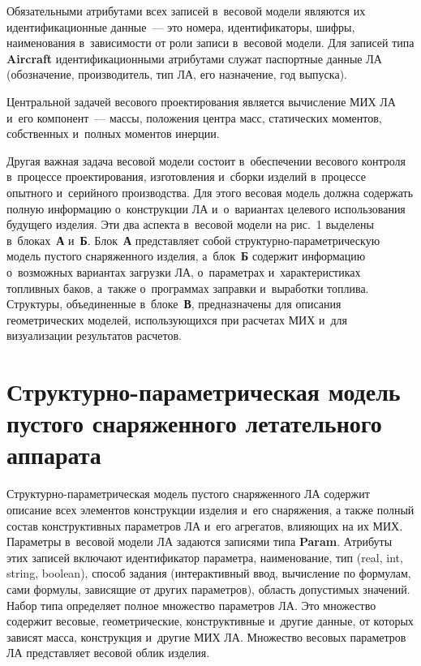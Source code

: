 \begin{multicols}{2}
Обязательными атрибутами всех записей 
в~весовой модели являются их идентификационные данные~--- это номера, 
идентификаторы, шиф\-ры, наименования в~зависимости от роли записи 
в~весовой модели. Для записей типа \textbf{Aircraft} 
идентификационными атрибутами служат паспортные данные ЛА 
(обозначение, производитель, тип ЛА, его назначение, год выпуска). 
  
  Центральной задачей весового проектирования является вычисление  
МИХ ЛА и~его компонент~--- 
массы, положения центра масс, статических моментов, собственных и~полных 
моментов инерции. 

Другая важная задача весовой модели состоит 
в~обеспечении весового контроля в~процессе проектирования, изготовления 
и~сборки изделий в~процессе опытного и~серийного производства. Для этого 
весовая модель должна содержать полную информацию о~конструкции ЛА 
и~о~вариантах целевого использования будущего изделия. Эти два аспекта 
в~весовой модели на рис.~1 выделены в~блоках~\textbf{А} и~\textbf{Б}. 
Блок~\textbf{А} пред\-став\-ля\-ет собой струк\-тур\-но-па\-ра\-мет\-ри\-че\-скую 
модель пустого снаряженного изделия, а~блок~\textbf{Б} содержит 
информацию о~возможных вариантах загрузки ЛА, о~па\-ра\-мет\-рах 
и~характеристиках топ\-лив\-ных баков, а~так\-же о~программах заправки 
и~выработки топлива. Структуры, объединенные в~блоке~\textbf{В}, 
предназначены для описания геометрических моделей, использующихся при 
расчетах МИХ и~для визуализации результатов расчетов.
  
\section{Структурно-параметрическая модель пустого снаряженного 
летательного аппарата}

  Структурно-параметрическая модель пустого снаряженного ЛА содержит 
описание всех элементов конструкции изделия и~его снаряжения, а также 
полный состав конструктивных па\-ра\-мет\-ров ЛА и~его агрегатов, влияющих на 
их МИХ. Параметры в~весовой модели ЛА 
задаются записями типа \textbf{Param}. Атрибуты этих записей 
включают идентификатор параметра, наименование, тип (real, int, string, 
boolean), способ задания (интерактивный ввод, вычисление по формулам, сами 
формулы, зависящие от других параметров), область допустимых значений. 
Набор типа  определяет полное множество параметров ЛА. Это множество 
содержит весовые, геометрические, конструктивные и~другие данные, от 
которых зависят масса, конструкция и~другие МИХ ЛА. Множество весовых 
параметров ЛА представляет весовой облик изделия.
  

\end{multicols}
